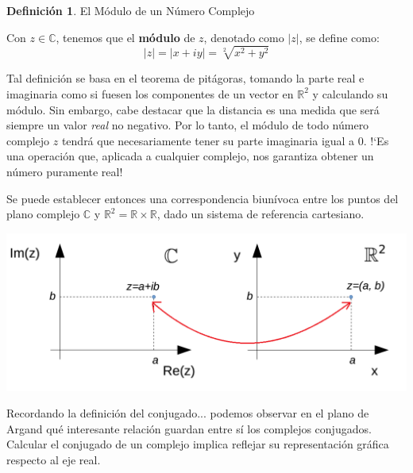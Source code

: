 \documentclass[12pt]{article}
\theoremstyle{definition}
\newtheorem{definition}{Definici\'on}[section]
\begin{document}
\colorbox{red!40!white!80}{\parbox{\linewidth}{
 \theoremstyle{definition}
 \begin{definition}{El M\'odulo de un N\'umero Complejo}

   Con $z \in \mathbb{C}$, tenemos que el \textbf{m\'odulo} de $z$, denotado como $|z|$, se define como:
  $$|z| = |x + iy| = \sqrt[2]{x^2 + y^2}$$ 
 
 \end{definition}}}
 \linebreak
 
 Tal definici\'on se basa en el teorema de pit\'agoras, tomando la parte real e imaginaria como si fuesen los componentes de un vector en $\mathbb{R}^2$ y calculando su m\'odulo. Sin embargo, cabe destacar que la distancia es una medida que ser\'a siempre un valor \textit{real} no negativo. Por lo tanto, el m\'odulo de todo n\'umero complejo $z$ tendr\'a que necesariamente tener su parte imaginaria igual a 0. !`Es una operaci\'on que, aplicada a cualquier complejo, nos garantiza obtener un n\'umero puramente real!
 
 Se puede establecer entonces una correspondencia biun\'ivoca entre los puntos del plano complejo $\mathbb{C}$ y $\mathbb{R}^2=\mathbb{R}\times\mathbb{R}$, dado un sistema de referencia cartesiano.
 
 \begin{center}
 	\includegraphics[scale=0.5]{correlacion.png}
 \end{center}
 
 Recordando la definici\'on del conjugado... podemos observar en el plano de Argand qu\'e interesante relaci\'on guardan entre s\'i los complejos conjugados. Calcular el conjugado de un complejo implica reflejar su representaci\'on gr\'afica respecto al eje real.
 
\end{document}
